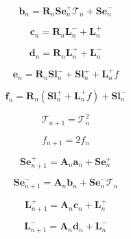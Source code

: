 \begin{equation}
\mathbf{b}_{n} = \mathbf{R}_{n}\mathbf{Se}^{+}_{n}\mathcal{T}_{n} + \mathbf{Se}^{-}_{n}
\label{eq:doubling-forward-b}
\end{equation}

\begin{equation}
\mathbf{c}_{n} = \mathbf{R}_{n}\mathbf{L}^{-}_{n} + \mathbf{L}^{+}_{n}
\label{eq:doubling-forward-c}
\end{equation}

\begin{equation}
\mathbf{d}_{n} = \mathbf{R}_{n}\mathbf{L}^{+}_{n} + \mathbf{L}^{-}_{n}
\label{eq:doubling-forward-d}
\end{equation}

\begin{equation}
\mathbf{e}_{n} = \mathbf{R}_{n}\mathbf{Sl}^{-}_{n} + \mathbf{Sl}^{+}_{n} + \mathbf{L}^{+}_{n}f
\label{eq:doubling-forward-e}
\end{equation}

\begin{equation}
\mathbf{f}_{n} = \mathbf{R}_{n}(\mathbf{Sl}^{+}_{n} + \mathbf{L}^{+}_{n}f) + \mathbf{Sl}^{-}_{n}
\label{eq:doubling-forward-f}
\end{equation}


\begin{equation}
\mathcal{T}_{n+1} = \mathcal{T}_{n}^{2}
\label{eq:doubling-forward-script_T_n_p_1}
\end{equation}

\begin{equation}
f_{n+1} = 2f_{n}
\label{eq:doubling-forward-f_n_p_1}
\end{equation}

\begin{equation}
\mathbf{Se}^{+}_{n+1} = \mathbf{A}_{n}\mathbf{a}_{n} + \mathbf{Se}^{+}_{n}
\label{eq:doubling-forward-Se_p}
\end{equation}

\begin{equation}
\mathbf{Se}^{-}_{n+1} = \mathbf{A}_{n}\mathbf{b}_{n} + \mathbf{Se}^{-}_{n}\mathcal{T}_{n}
\label{eq:doubling-forward-Se_m}
\end{equation}

\begin{equation}
\mathbf{L}^{+}_{n+1} = \mathbf{A}_{n}\mathbf{c}_{n} + \mathbf{L}^{+}_{n}
\label{eq:doubling-forward-a_p}
\end{equation}

\begin{equation}
\mathbf{L}^{-}_{n+1} = \mathbf{A}_{n}\mathbf{d}_{n} + \mathbf{L}^{-}_{n}
\label{eq:doubling-forward-a_m}
\end{equation}

